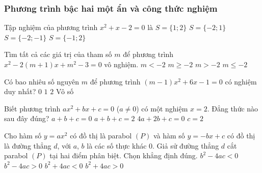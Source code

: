 \subsubsection{Phương trình bậc hai một ẩn và công thức nghiệm}
\begin{bt}
	Tập nghiệm của phương trình $x^2+x-2=0$ là
	\choice
	{$S=\{1;2\}$}
	{\True $S=\{-2;1\}$}
	{$S=\{-2;-1\}$}
	{$S=\{-1;2\}$}
\end{bt}
\begin{bt}
	Tìm tất cả các giá trị của tham số $m$ để phương trình $x^{2}-2(m+1)x+m^{2}-3=0$ vô nghiệm.
	\choice
	{\True $m<-2$}
	{$m\ge -2$}
	{$m>-2$}
	{$m\le -2$}
\end{bt}
\begin{bt}
	Có bao nhiêu số nguyên $m$ để phương trình $(m-1)x^2+6x-1=0$ có nghiệm duy nhất?
	\choice
	{$0$}
	{$1$}
	{\True $2$}
	{Vô số}
\end{bt}
\begin{bt}
	Biết phương trình $ax^2+bx+c=0$ ($a\ne 0$) có một nghiệm $x=2$. Đẳng thức nào sau đây đúng?
	\choice
	{$a+b+c=0$}
	{$a+b+c=2$}
	{\True $4a+2b+c=0$}
	{$c=2$}
\end{bt}
\begin{bt}
	Cho hàm số $y=ax^2$ có đồ thị là parabol $(P)$ và hàm số $y=-bx+c$ có đồ thị là đường thẳng $d$, với $a$, $b$ là các số thực khác $0$. Giả sử đường thẳng $d$ cắt parabol $(P)$ tại hai điểm phân biệt. Chọn khẳng định đúng.
	\choice
	{$b^2-4ac<0$}
	{$b^2-4ac>0$}
	{$b^2+4ac<0$}
	{\True $b^2+4ac>0$}
\end{bt}
